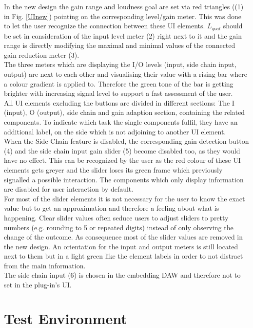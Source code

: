 In the new design the gain range and loudness goal are set via red triangles ((1) in Fig. \ref{UInew}) pointing on the corresponding level/gain meter. This was done to let the user recognize the connection between these UI elements. $L_{goal}$ should be set in consideration of the input level meter (2) right next to it and the gain range is directly modifying the maximal and minimal values of the connected gain reduction meter (3).\\
The three meters which are displaying the I/O levels (input, side chain input, output) are next to each other and visualising their value with a rising bar where a colour gradient is applied to. Therefore the green tone of the bar is getting brighter with increasing signal level to support a fast assessment of the user.\\
All UI elements excluding the buttons are divided in different sections: The I (input), O (output), side chain and gain adaption section, containing the related components. To indicate which task the single components fulfil, they have an additional label, on the side which is not adjoining to another UI element.\\
When the Side Chain feature is disabled, the corresponding gain detection button (4) and the side chain input gain slider (5) become disabled too, as they would have no effect. This can be recognized by the user as the red colour of these UI elements gets greyer and the slider loses its green frame which previously signalled a possible interaction. The components which only display information are disabled for user interaction by default.\\
For most of the slider elements it is not necessary for the user to know the exact value but to get an approximation and therefore a feeling about what is happening. Clear slider values often seduce users to adjust sliders to pretty numbers (e.g. rounding to 5 or repeated digits) instead of only observing the change of the outcome. As consequence most of the slider values are removed in the new design. An orientation for the input and output meters is still located next to them but in a light green like the element labels in order to not distract from the main information.\\
The side chain input (6) is chosen in the embedding DAW and therefore not to set in the plug-in’s UI.\\

\section{Test Environment}

